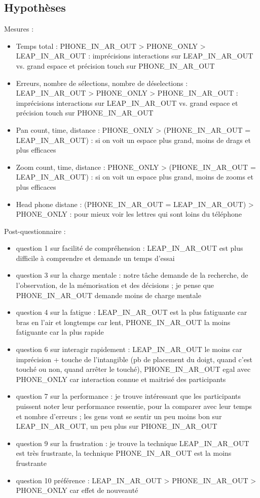 \subsection{Hypothèses}
Mesures :
\begin{itemize}
  \item Temps total : PHONE\_IN\_AR\_OUT > PHONE\_ONLY > LEAP\_IN\_AR\_OUT : imprécisions interactions sur LEAP\_IN\_AR\_OUT vs. grand espace et précision touch sur PHONE\_IN\_AR\_OUT
  \item Erreurs, nombre de sélections, nombre de déselections : LEAP\_IN\_AR\_OUT > PHONE\_ONLY > PHONE\_IN\_AR\_OUT : imprécisions interactions sur LEAP\_IN\_AR\_OUT vs. grand espace et précision touch sur PHONE\_IN\_AR\_OUT
  \item Pan count, time, distance : PHONE\_ONLY > (PHONE\_IN\_AR\_OUT = LEAP\_IN\_AR\_OUT) : si on voit un espace plus grand, moins de drags et plus efficaces
  \item Zoom count, time, distance : PHONE\_ONLY > (PHONE\_IN\_AR\_OUT = LEAP\_IN\_AR\_OUT) : si on voit un espace plus grand, moins de zooms et plus efficaces
  \item Head phone distane : (PHONE\_IN\_AR\_OUT = LEAP\_IN\_AR\_OUT) > PHONE\_ONLY : pour mieux voir les lettres qui sont loins du téléphone
\end{itemize}

Post-questionnaire :
\begin{itemize}
  \item question 1 sur facilité de compréhension : LEAP\_IN\_AR\_OUT est plus difficile à comprendre et demande un temps d'essai
  \item question 3 sur la charge mentale : notre tâche demande de la recherche, de l'observation, de la mémorisation et des décisions ; je pense que PHONE\_IN\_AR\_OUT demande moins de charge mentale
  \item question 4 sur la fatigue : LEAP\_IN\_AR\_OUT est la plus fatiguante car bras en l'air et longtemps car lent, PHONE\_IN\_AR\_OUT la moins fatiguante car la plus rapide
  \item question 6 sur interagir rapidement : LEAP\_IN\_AR\_OUT le moins car imprécision + touche de l'intangible (pb de placement du doigt, quand c'est touché ou non, quand arrêter le touché), PHONE\_IN\_AR\_OUT egal avec PHONE\_ONLY car interaction connue et maitrisé des participants
  \item question 7 sur la performance : je trouve intéressant que les participants puissent noter leur performance ressentie, pour la comparer avec leur temps et nombre d'erreurs ; les gens vont se sentir un peu moins bon sur LEAP\_IN\_AR\_OUT, un peu plus sur PHONE\_IN\_AR\_OUT
  \item question 9 sur la frustration : je trouve la technique LEAP\_IN\_AR\_OUT est très frustrante, la technique PHONE\_IN\_AR\_OUT est la moins frustrante
  \item question 10 préférence : LEAP\_IN\_AR\_OUT > PHONE\_IN\_AR\_OUT > PHONE\_ONLY car effet de nouveauté
\end{itemize}


